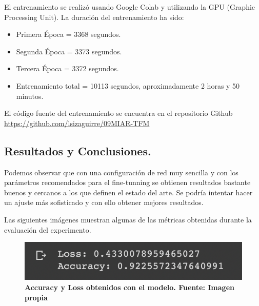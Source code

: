 El entrenamiento se realizó usando Google Colab y utilizando la GPU (Graphic Processing Unit). La duración del entrenamiento ha sido:

\begin{itemize}
    \item Primera Época = 3368 segundos.
    \item Segunda Época = 3373 segundos. 
    \item Tercera Época = 3372 segundos.
    \item Entrenamiento total = 10113 segundos, aproximadamente 2 horas y 50 minutos.
\end{itemize}

El código fuente del entrenamiento se encuentra en el repositorio Github \url{https://github.com/lsizaguirre/09MIAR-TFM}


\subsection{Resultados y Conclusiones.}
\label{as-resultados-y-conclusiones}

Podemos observar que con una configuración de red muy sencilla y con los parámetros recomendados para el fine-tunning se obtienen resultados bastante buenos y cercanos a los que definen el estado del arte. Se podría intentar hacer un ajuste más sofisticado y con ello obtener mejores resultados.

Las siguientes imágenes muestran algunas de las métricas obtenidas durante la evaluación del experimento.

\begin{figure}[ht!]
    \centering
    \includegraphics[scale=0.6]{figuras/as-resultados-1.png}
    \caption[Análisis de Sentimiento - Resultados - Accuracy y Loss]{\textbf{Accuracy y Loss obtenidos con el modelo. Fuente: Imagen propia}}
    \label{fig-as-resultados-1}
\end{figure}

